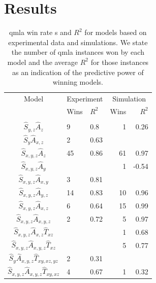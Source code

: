 \section{Results}
\begin{table}[h]
    \centering
    \begin{tabular}{cllrr}
    \hline
     Model & \multicolumn{2}{c}{Experiment} & \multicolumn{2}{c}{Simulation}    \\
     & Wins   & $R^2$   & Wins   & $R^2$   \\
    \hline
    \\
     $\hat{S}_{y,z}\hat{A}_{z}$                      & 9      & 0.8     & 1      & 0.26    \\
     $\hat{S}_{y}\hat{A}_{x,z}$                      & 2      & 0.63    &        &         \\
     $\hat{S}_{x,y,z}\hat{A}_{z}$                    & 45     & 0.86    & 61     & 0.97    \\
     $\hat{S}_{x,y,z}\hat{A}_{y}$                    &        &         & 1      & -0.54   \\
     $\hat{S}_{x,y,z}\hat{A}_{x,y}$                  & 3      & 0.81    &        &         \\
     $\hat{S}_{x,y,z}\hat{A}_{y,z}$                  & 14     & 0.83    & 10     & 0.96    \\
     $\hat{S}_{x,y,z}\hat{A}_{x,z}$                  & 6      & 0.64    & 15     & 0.99    \\
     $\hat{S}_{x,y,z}\hat{A}_{x,y,z}$                & 2      & 0.72    & 5      & 0.97    \\
     $\hat{S}_{x,y,z}\hat{A}_{x,z}\hat{T}_{xz}$      &        &         & 1      & 0.68    \\
     $\hat{S}_{x,y,z}\hat{A}_{x,y,z}\hat{T}_{xz}$    &        &         & 5      & 0.77    \\
     $\hat{S}_{y}\hat{A}_{x,y,z}\hat{T}_{xy,xz,yz}$  & 2      & 0.31    &        &         \\
     $\hat{S}_{x,y,z}\hat{A}_{x,y,z}\hat{T}_{xy,xz}$ & 4      & 0.67    & 1      & 0.32    \\
    \hline
    \end{tabular}
    \caption[
        \gls{qmla}  \gls{win rate} s and $R^2$ for models based on experimental data and simulations. 
    ]{
        \gls{qmla}  \gls{win rate} s and $R^2$ for models based on experimental data and simulations. 
        We state the number of \gls{qmla} \glspl{instance} won by each model and the average $R^2$ for those \glspl{instance} as an indication of the
        predictive power of winning models.
    }
    \label{table:win_rates_r_squareds}
\end{table}

